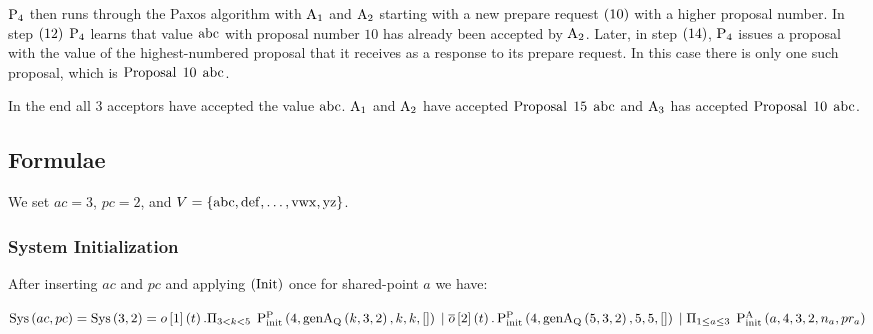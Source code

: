 $\operatorname{P_{4}}$ then runs through the Paxos algorithm with $\operatorname{A_{1}}$ and $\operatorname{A_{2}}$ starting with a new prepare request $\left(10\right)$ with a higher proposal number.
In step $\left(12\right)$ $\operatorname{P_{4}}$ learns that value $\operatorname{abc}$ with proposal number $10$ has already been accepted by $\operatorname{A_{2}}$.
Later, in step $\left(14\right)$, $\operatorname{P_{4}}$ issues a proposal with the value of the highest-numbered proposal that it receives as a response to its prepare request.
In this case there is only one such proposal, which is $\operatorname{Proposal}\; 10\; \operatorname{abc}$.

In the end all $3$ acceptors have accepted the value $\operatorname{abc}$.
$\operatorname{A_{1}}$ and $\operatorname{A_{2}}$ have accepted $\operatorname{Proposal}\; 15\; \operatorname{abc}$ and $\operatorname{A_{3}}$ has accepted $\operatorname{Proposal}\; 10\; \operatorname{abc}$.

\subsection{Formulae}
We set $ac = 3$, $pc = 2$, and $V=\left\{\operatorname{abc}, \operatorname{def}, \dots, \operatorname{vwx}, \operatorname{yz}\right\}$.

\subsubsection{System Initialization}
After inserting $ac$ and $pc$ and applying $\left(\operatorname{Init}\right)$ once for shared-point $a$ we have:

$\operatorname{Sys}\left(ac, pc\right) = \operatorname{Sys}\left(3, 2\right) =
o\left[1\right]\left(t\right).\Pi_{3 < k < 5}\; \operatorname{P^{P}_{init}}\left(4, \operatorname{genA_Q}\left(k, 3, 2\right), k, k, []\right)\\
\; | \; \overline{o}\left[2\right]\left(t\right).\operatorname{P^{P}_{init}}\left(4, \operatorname{genA_Q}\left(5, 3, 2\right), 5, 5, []\right)\\
\; | \; \Pi_{1 \le a \le 3}\; \operatorname{P^{A}_{init}}\left(a, 4, 3, 2, n_{a}, pr_{a}\right)$



